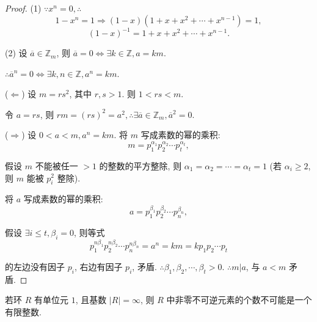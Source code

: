 \documentclass[color=black,device=normal,lang=cn,mode=geye]{elegantnote}
\begin{document}
\begin{proof}
    (1) $\because x^n=0,\therefore$
    \[1-x^n=1\Rightarrow(1-x)(1+x+x^2+\cdots+x^{n-1})=1,\]
    \[(1-x)^{-1}=1+x+x^2+\cdots+x^{n-1}.\]

    (2) 设 $\overline{a}\in\mathbb{Z}_m$, 则 $\overline{a}=0\Leftrightarrow\exists k\in\mathbb{Z},a=km$.

    $\therefore\overline{a}^n=0\Leftrightarrow\exists k,n\in\mathbb{Z},a^n=km$.

    ($\Leftarrow$) 设 $m=rs^2$, 其中 $r,s>1$. 则 $1<rs<m$.

    令 $a=rs$, 则 $rm=(rs)^2=a^2,\therefore\exists\overline{a}\in\mathbb{Z}_m,\overline{a}^2=0$.

    ($\Rightarrow$) 设 $0<a<m,a^n=km$. 将 $m$ 写成素数的幂的乘积:
    \[m=p_1^{\alpha_1}p_2^{\alpha_2}\cdots p_t^{\alpha_t},\]

    假设 $m$ 不能被任一 $>1$ 的整数的平方整除, 则 $\alpha_1=\alpha_2=\cdots=\alpha_t=1$ (若 $\alpha_i\geq2$, 则 $m$ 能被 $p_i^2$ 整除).

    将 $a$ 写成素数的幂的乘积:
    \[a=p_1^{\beta_1}p_2^{\beta_2}\cdots p_n^{\beta_n},\]
    
    假设 $\exists i\leq t,\beta_i=0$, 则等式
    \[p_1^{n\beta_1}p_2^{n\beta_2}\cdots p_n^{n\beta_n}=a^n=km=kp_1p_2\cdots p_t\]

    的左边没有因子 $p_i$, 右边有因子 $p_i$, 矛盾. $\therefore\beta_1,\beta_2,\cdots,\beta_t>0$. $\therefore m|a$, 与 $a<m$ 矛盾.
\end{proof}
\begin{exercise}%
    若环 $R$ 有单位元 $1$, 且基数 $|R|=\infty$, 则 $R$ 中非零不可逆元素的个数不可能是一个有限整数.
\end{exercise}
\end{document}
